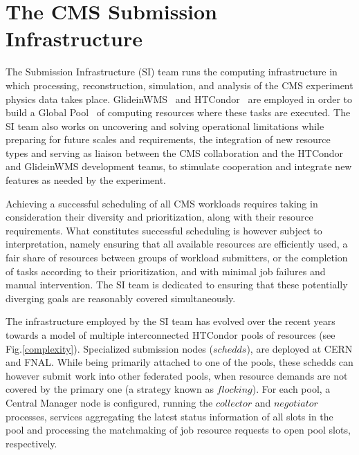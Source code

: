 \documentclass{webofc}
\begin{document}
\section{The CMS Submission Infrastructure}
\label{sec:intro}

The Submission Infrastructure (SI) team runs the computing infrastructure in which processing, reconstruction, simulation, and analysis of the CMS experiment physics data takes place. GlideinWMS~\cite{gwms} and HTCondor~\cite{htcondor} are employed in order to build a Global Pool~\cite{global_pool} of computing resources where these tasks are executed. The SI team also works on uncovering and solving operational limitations while preparing for future scales and requirements, the integration of new resource types and serving as liaison between the CMS collaboration and the HTCondor and GlideinWMS development teams, to stimulate cooperation and integrate new features as needed by the experiment.  

Achieving a successful scheduling of all CMS workloads requires taking in consideration their diversity and prioritization, along with their resource requirements. What constitutes successful scheduling is however subject to interpretation, namely ensuring that all available resources are efficiently used, a fair share of resources between groups of workload submitters, or the completion of tasks according to their prioritization, and with minimal job failures and manual intervention. The SI team is dedicated to ensuring that these potentially diverging goals are reasonably covered simultaneously.

The infrastructure employed by the SI team has evolved over the recent years towards a model of multiple interconnected HTCondor pools of resources (see Fig.\ref{complexity}). Specialized submission nodes ($schedds$), are deployed at CERN and FNAL. While being primarily attached to one of the pools, these schedds can however submit work into other federated pools, when resource demands are not covered by the primary one (a strategy known as $flocking$). For each pool, a Central Manager node is configured, running the $collector$ and $negotiator$ processes, services aggregating the latest status information of all slots in the pool and processing the matchmaking of job resource requests to open pool slots, respectively. 
\end{document}
